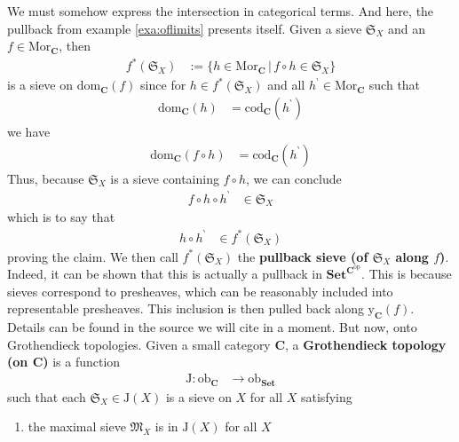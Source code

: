 \begin{exa}
We must somehow express the intersection in categorical terms.
And here, the pullback from example \ref{exa:oflimits} presents itself.
Given a sieve $\mathfrak{S}_{X}$ and an $f \in \mathrm{Mor}_{\mathbf{C}}$, then
\begin{align*}
  f^{\ast}(\mathfrak{S}_{X})
  &:=
  \lbrace
      h
      \in
      \mathrm{Mor}_{\mathbf{C}}
    \,
    \vert
    \,
      f
      \circ
      h
      \in
      \mathfrak{S}_{X}
  \rbrace
\end{align*}
is a sieve on $\mathrm{dom}_{\mathbf{C}}(f)$ since for $h \in f^{\ast}(\mathfrak{S}_{X})$ and all $h^{\backprime} \in \mathrm{Mor}_{\mathbf{C}}$ such that
\begin{align*}
  \mathrm{dom}_{\mathbf{C}}(h)
  &=
  \mathrm{cod}_{\mathbf{C}}(h^{\backprime})
\end{align*}
we have
\begin{align*}
  \mathrm{dom}_{\mathbf{C}}(f \circ h)
  &=
  \mathrm{cod}_{\mathbf{C}}(h^{\backprime})
\end{align*}
Thus, because $\mathfrak{S}_{X}$ is a sieve containing $f \circ h$, we can conclude
\begin{align*}
  f
  \circ
  h
  \circ
  h^{\backprime}
  &\in
  \mathfrak{S}_{X}
\end{align*}
which is to say that
\begin{align*}
  h
  \circ
  h^{\backprime}
  &\in
  f^{\ast}(\mathfrak{S}_{X})
\end{align*}
proving the claim.
We then call $f^{\ast}(\mathfrak{S}_{X})$ the \textbf{pullback sieve (of $\mathfrak{S}_{X}$ along $f$)}.
Indeed, it can be shown that this is actually a pullback in $\mathbf{Set}^{\mathbf{C}^{\mathrm{op}}}$.
This is because sieves correspond to presheaves, which can be reasonably included into representable presheaves.
This inclusion is then pulled back along $\mathrm{y}_{\mathbf{C}}(f)$.
Details can be found in the source we will cite in a moment.
But now, onto Grothendieck topologies.
Given a small category $\mathbf{C}$, a \textbf{Grothendieck topology (on $\mathbf{C}$)} is a function
\begin{align*}
  \mathrm{J}
  \colon
  \mathrm{ob}_{\mathbf{C}}
  &\rightarrow
  \mathrm{ob}_{\mathbf{Set}}
\end{align*}
such that each $\mathfrak{S}_{X} \in \mathrm{J}(X)$ is a sieve on $X$ for all $X$ satisfying
\begin{enumerate}
\item[(J1)]
the maximal sieve $\mathfrak{M}_{X}$ is in $\mathrm{J}(X)$ for all $X$

\end{enumerate}
\end{exa}
